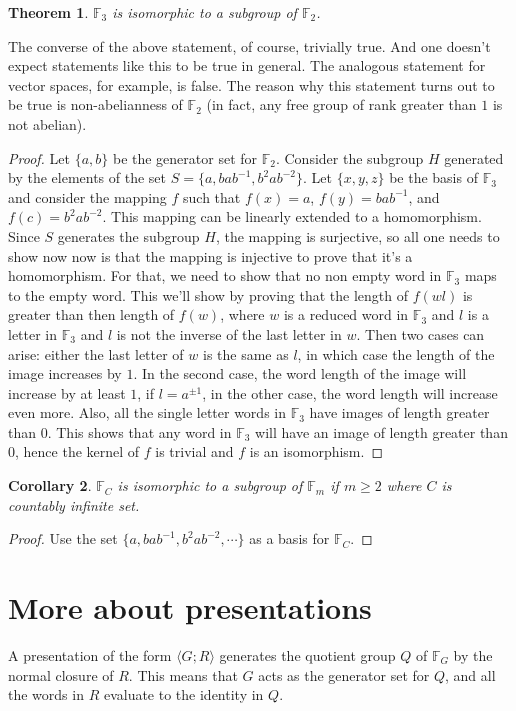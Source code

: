 \documentclass[12pt]{article}
\newtheorem{thm}{Theorem}[section]
\newtheorem{cor}[thm]{Corollary}
\theoremstyle{definition}
\begin{document}
\begin{thm}\cite{meier}
$\mathbb{F}_3$ is isomorphic to a subgroup of $\mathbb{F}_2$.
\end{thm}
The converse of the above statement, of course, trivially true. And one doesn't expect statements like this to be true in general. The analogous statement for vector spaces, for example, is false. The reason why this statement turns out to be true is non-abelianness of $\mathbb{F}_2$ (in fact, any free group of rank greater than $1$ is not abelian).
\begin{proof}
Let $\{a,b\}$ be the generator set for $\mathbb{F}_2$. Consider the subgroup $H$ generated by the elements of the set $S = \{a, bab^{-1}, b^2ab^{-2}\}$. Let $\{x,y,z\}$ be the basis of $\mathbb{F}_3$ and consider the mapping $f$ such that $f(x)=a$, $f(y)=bab^{-1}$, and $f(c) = b^2ab^{-2}$. This mapping can be linearly extended to a homomorphism. Since $S$ generates the subgroup $H$, the mapping is surjective, so all one needs to show now now is that the mapping is injective to prove that it's a homomorphism. For that, we need to show that no non empty word in $\mathbb{F}_3$ maps to the empty word. This we'll show by proving that the length of $f(wl)$ is greater than then length of $f(w)$, where $w$ is a reduced word in $\mathbb{F}_3$ and $l$ is a letter in $\mathbb{F}_3$ and $l$ is not the inverse of the last letter in $w$. Then two cases can arise: either the last letter of $w$ is the same as $l$, in which case the length of the image increases by $1$. In the second case, the word length of the image will increase by at least $1$, if $l=a^{\pm 1}$, in the other case, the word length will increase even more. Also, all the single letter words in $\mathbb{F}_3$ have images of length greater than $0$. This shows that any word in $\mathbb{F}_3$ will have an image of length greater than $0$, hence the kernel of $f$ is trivial and $f$ is an isomorphism.
\end{proof}

\begin{cor}
$\mathbb{F}_C$ is isomorphic to a subgroup of $\mathbb{F}_m$ if $m \geq 2$ where $C$ is countably infinite set.
\end{cor}

\begin{proof}
Use the set $\{a, bab^{-1}, b^2ab^{-2}, \cdots\}$ as a basis for $\mathbb{F}_C$.
\end{proof}

\section{More about presentations}
A presentation of the form $\langle G;R \rangle$ generates the quotient group $Q$ of $\mathbb{F}_G$ by the normal closure of $R$. This means that $G$ acts as the generator set for $Q$, and all the words in $R$ evaluate to the identity in $Q$.
\end{document}
